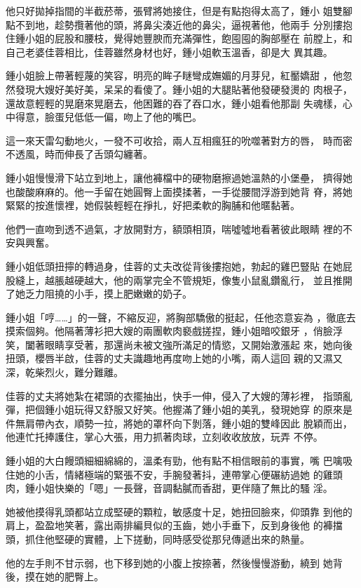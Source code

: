 他只好拋掉指間的半截菸蒂，張臂將她接住，但是有點抱得太高了，鍾小
姐雙腳點不到地，趁勢攬著他的頭，將鼻尖湊近他的鼻尖，逼視著他，他兩手
分別摟抱住鍾小姐的屁股和腰枝，覺得她豐腴而充滿彈性，飽囤囤的胸部壓在
前膛上，和自己老婆佳蓉相比，佳蓉雖然身材也好，鍾小姐軟玉溫香，卻是大
異其趣。

鍾小姐臉上帶著輕蔑的笑容，明亮的眸子瞇彎成嫵媚的月芽兒，紅靨嬌甜
，他忽然發現大嫂好美好美，呆呆的看傻了。鍾小姐的大腿貼著他發硬發燙的
肉根子，還故意輕輕的晃磨來晃磨去，他困難的吞了吞口水，鍾小姐看他那副
失魂樣，心中得意，臉蛋兒低低一偏，吻上了他的嘴巴。

這一來天雷勾動地火，一發不可收拾，兩人互相瘋狂的吮噬著對方的唇，
時而密不透風，時而伸長了舌頭勾纏著。

鍾小姐慢慢滑下站立到地上，讓他褲檔中的硬物磨擦過她溫熱的小堡壘，
擠得她也酸酸麻麻的。他一手留在她圓臀上面摸揉著，一手從腰間浮游到她背
脊，將她緊緊的按進懷裡，她假裝輕輕在掙扎，好把柔軟的胸脯和他暱黏著。

他們一直吻到透不過氣，才放開對方，額頭相頂，喘噓噓地看著彼此眼睛
裡的不安與興奮。

鍾小姐低頭扭擰的轉過身，佳蓉的丈夫改從背後摟抱她，勃起的雞巴豎貼
在她屁股縫上，越脹越硬越大，他的兩掌完全不管規矩，像隻小鼠亂鑽亂行，
並且推開了她乏力阻撓的小手，摸上肥嫩嫩的奶子。

鍾小姐「哼……」的一聲，不縮反迎，將胸部驕傲的挺起，任他恣意妄為
，徹底去摸索個夠。他隔著薄衫把大嫂的兩團軟肉褻戲搓捏，鍾小姐暗咬銀牙
，俏臉浮笑，闔著眼睛享受著，那還尚未被文強所滿足的情慾，又開始激漲起
來，她向後扭頭，櫻唇半啟，佳蓉的丈夫識趣地再度吻上她的小嘴，兩人這回
親的又濕又深，乾柴烈火，難分難離。

佳蓉的丈夫將她紮在裙頭的衣擺抽出，快手一伸，侵入了大嫂的薄衫裡，
指頭亂彈，把個鍾小姐玩得又舒服又好笑。他握滿了鍾小姐的美乳，發現她穿
的原來是件無肩帶內衣，順勢一拉，將她的罩杯向下剝落，鍾小姐的雙峰因此
脫穎而出，他連忙托捧護住，掌心大張，用力抓著肉球，立刻收收放放，玩弄
不停。

鍾小姐的大白饅頭細細綿綿的，溫柔有勁，他有點不相信眼前的事實，嘴
巴噙吸住她的小舌，情緒極端的緊張不安，手腕發著抖，連帶掌心便碾紡過她
的雞頭肉，鍾小姐快樂的「嗯」一長聲，音調黏膩而香甜，更伴隨了無比的騷
淫。

她被他摸得乳頭都站立成堅硬的顆粒，敏感度十足，她扭回臉來，仰頭靠
到他的肩上，盈盈地笑著，露出兩排編貝似的玉齒，她小手垂下，反到身後他
的褲擋頭，抓住他堅硬的實體，上下搓動，同時感受從那兒傳遞出來的熱量。

他的左手則不甘示弱，也下移到她的小腹上按捺著，然後慢慢游動，繞到
她背後，摸在她的肥臀上。

